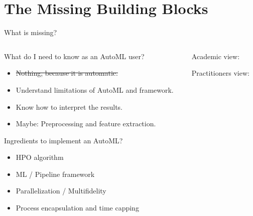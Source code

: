 \section{The Missing Building Blocks}

\begin{frame}{What is missing?}
  \begin{columns}
    \begin{column}{0.5\textwidth}
        What do I need to know as an AutoML user?
        \begin{itemize}
          \item \sout{Nothing, because it is automatic.}
          \item Understand limitations of AutoML and framework.
          \item Know how to interpret the results.
          \item Maybe: Preprocessing and feature extraction.
        \end{itemize}

        \vspace{1em}

        Ingredients to implement an AutoML?
        \begin{itemize}
          \item HPO algorithm
          \item ML / Pipeline framework 
          \item Parallelization / Multifidelity
          \item Process encapsulation and time capping 
        \end{itemize}
    \end{column}%
    \begin{column}{0.5\textwidth}
      \begin{center}
        Academic view:
        \scalebox{0.45}{
          
        }

        \vspace{1em}

        Practitioners view:
        \scalebox{0.45}{
          
        }
      \end{center}
    \end{column}
  \end{columns}
\end{frame}


